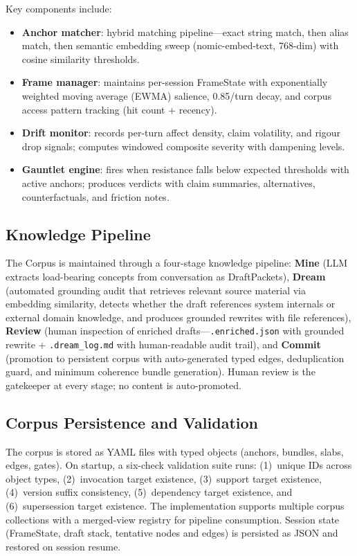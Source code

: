 \documentclass[11pt,a4paper]{article}
\begin{document}
Key components include:
\begin{itemize}[leftmargin=2em]
    \item \textbf{Anchor matcher}: hybrid matching pipeline---exact string match, then alias match, then semantic embedding sweep (nomic-embed-text, 768-dim) with cosine similarity thresholds.
    \item \textbf{Frame manager}: maintains per-session FrameState with exponentially weighted moving average (EWMA) salience, 0.85/turn decay, and corpus access pattern tracking (hit count + recency).
    \item \textbf{Drift monitor}: records per-turn affect density, claim volatility, and rigour drop signals; computes windowed composite severity with dampening levels.
    \item \textbf{Gauntlet engine}: fires when resistance falls below expected thresholds with active anchors; produces verdicts with claim summaries, alternatives, counterfactuals, and friction notes.
\end{itemize}

\subsection{Knowledge Pipeline}

The Corpus is maintained through a four-stage knowledge pipeline: \textbf{Mine} (LLM extracts load-bearing concepts from conversation as DraftPackets), \textbf{Dream} (automated grounding audit that retrieves relevant source material via embedding similarity, detects whether the draft references system internals or external domain knowledge, and produces grounded rewrites with file references), \textbf{Review} (human inspection of enriched drafts---\texttt{.enriched.json} with grounded rewrite + \texttt{.dream\_log.md} with human-readable audit trail), and \textbf{Commit} (promotion to persistent corpus with auto-generated typed edges, deduplication guard, and minimum coherence bundle generation).
Human review is the gatekeeper at every stage; no content is auto-promoted.

\subsection{Corpus Persistence and Validation}

The corpus is stored as YAML files with typed objects (anchors, bundles, slabs, edges, gates).
On startup, a six-check validation suite runs: (1)~unique IDs across object types, (2)~invocation target existence, (3)~support target existence, (4)~version suffix consistency, (5)~dependency target existence, and (6)~supersession target existence.
The implementation supports multiple corpus collections with a merged-view registry for pipeline consumption.
Session state (FrameState, draft stack, tentative nodes and edges) is persisted as JSON and restored on session resume.
\end{document}

